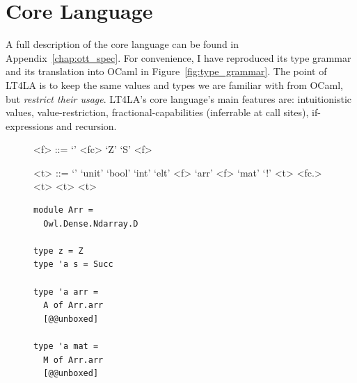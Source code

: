 \section{Core Language}\label{sec:core_lang}

A full description of the core language can be found in
Appendix~\ref{chap:ott_spec}. For convenience, I have reproduced its type
grammar and its translation into OCaml in Figure~\ref{fig:type_grammar}.  The
point of LT4LA is to keep the same values and types we are familiar with from
OCaml, but \emph{restrict their usage}. LT4LA's core language's main features
are: intuitionistic values, value-restriction, fractional-capabilities
(inferrable at call sites), if-expressions and recursion.

\begin{figure}[tp]
    \centering
    \begin{minipage}{.3\textwidth}
        \centering
        \begin{grammar}
            <f> ::= `'
            \alt <fc>
            \alt `Z'
            \alt `S' <f>

            <t> ::= `'
            \alt `unit'
            \alt `bool'
            \alt `int'
            \alt `elt'
            \alt <f> `arr'
            \alt <f> `mat'
            \alt `!' <t>
            \alt \synt{$\forall$} <fc.> <t>
            \alt <t> \lit{$\otimes$} 
            \alt <t> \lit{$\multimap$} 
        \end{grammar}
    \end{minipage}
    \begin{minipage}{.3\textwidth}
        \centering
        \begin{verbatim}
module Arr =
  Owl.Dense.Ndarray.D

type z = Z
type 'a s = Succ

type 'a arr =
  A of Arr.arr
  [@@unboxed]

type 'a mat =
  M of Arr.arr
  [@@unboxed]


\end{verbatim}
\end{minipage}
\end{figure}
